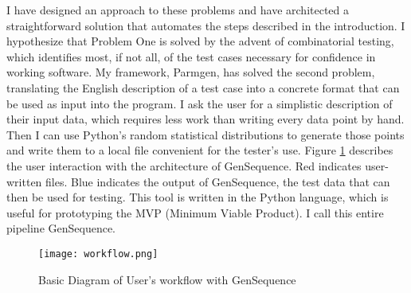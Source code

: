 I have designed an approach to these problems and have architected a straightforward solution that automates the steps described in the introduction. I hypothesize that Problem One is solved by the advent of combinatorial testing, which identifies most, if not all, of the test cases necessary for confidence in working software. My framework, Parmgen, has solved the second problem, translating the English description of a test case into a concrete format that can be used as input into the program. I ask the user for a simplistic description of their input data, which requires less work than writing every data point by hand. Then I can use Python's random statistical distributions to generate those points and write them to a local file convenient for the tester’s use. Figure \ref{fig:workflo} describes the user interaction with the architecture of GenSequence. Red indicates user-written files. Blue indicates the output of GenSequence, the test data that can then be used for testing. This tool is written in the Python language, which is useful for prototyping the MVP (Minimum Viable Product). I call this entire pipeline GenSequence.

\begin{figure}[H]
\centering
\texttt{[image: workflow.png]}
\caption{Basic Diagram of User's workflow with GenSequence}
\label{fig:workflo}
\end{figure}